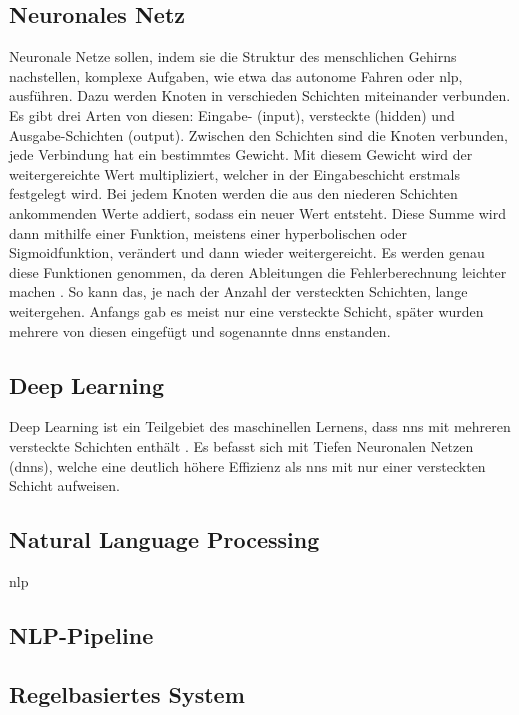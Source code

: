 \subsection{Neuronales Netz}

Neuronale Netze sollen, indem sie die Struktur des menschlichen Gehirns nachstellen, komplexe Aufgaben, wie etwa das autonome Fahren oder \ac{nlp}, ausführen.
Dazu werden Knoten in verschieden Schichten miteinander verbunden.
Es gibt drei Arten von diesen: Eingabe- (input), versteckte (hidden) und Ausgabe-Schichten (output).
Zwischen den Schichten sind die Knoten verbunden, jede Verbindung hat ein bestimmtes Gewicht.
Mit diesem Gewicht wird der weitergereichte Wert multipliziert, welcher in der Eingabeschicht erstmals festgelegt wird.
Bei jedem Knoten werden die aus den niederen Schichten ankommenden Werte addiert, sodass ein neuer Wert entsteht.
Diese Summe wird dann mithilfe einer Funktion, meistens einer hyperbolischen oder Sigmoidfunktion, verändert und dann wieder weitergereicht.
Es werden genau diese Funktionen genommen, da deren Ableitungen die Fehlerberechnung leichter machen \citep{deeplearningarchitecturesreview}.
So kann das, je nach der Anzahl der versteckten Schichten, lange weitergehen.
Anfangs gab es meist nur eine versteckte Schicht, später wurden mehrere von diesen eingefügt und sogenannte \aclp{dnn} enstanden.

\subsection{Deep Learning}

Deep Learning ist ein Teilgebiet des maschinellen Lernens, dass \acp{nn} mit mehreren versteckte Schichten enthält \citep{deeplearningreview}.
Es befasst sich mit Tiefen Neuronalen Netzen (\acsp{dnn}), welche eine deutlich höhere Effizienz als \acp{nn} mit nur einer versteckten Schicht aufweisen.

\subsection{Natural Language Processing}

\acf{nlp}

\subsection{NLP-Pipeline}



\subsection{Regelbasiertes System}
